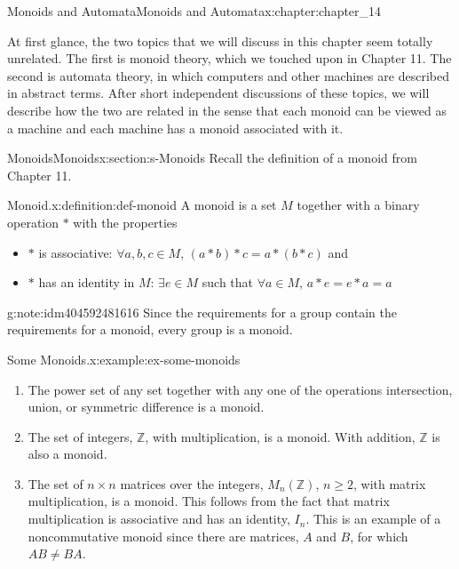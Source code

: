 \documentclass[twoside,10pt,]{book}
\numberwithin{equation}{section}
\begin{document}
\begin{chapterptx}{Monoids and Automata}{}{Monoids and Automata}{}{}{x:chapter:chapter_14}
\begin{introduction}{}%
At first glance, the two topics that we will discuss in this chapter seem totally unrelated. The first is monoid theory, which we touched upon in Chapter 11. The second is automata theory, in which computers and other machines are described in abstract terms. After short independent discussions of these topics, we will describe how the two are related in the sense that each monoid can be viewed as a machine and each machine has a monoid associated with it.%
\end{introduction}%
%
%
\typeout{************************************************}
\typeout{************************************************}
%
\begin{sectionptx}{Monoids}{}{Monoids}{}{}{x:section:s-Monoids}
%
Recall the definition of a monoid from Chapter 11.%
\begin{definition}{Monoid.}{x:definition:def-monoid}%
%
A monoid is a set \(M\) together with a binary operation \(*\) with the properties%
\begin{itemize}[label=\textbullet]
\item{}\(*\) is associative: \(\forall a,b,c \in M\), \((a*b)*c=a*(b*c)\)  and%
\item{}\(*\) has an identity in \(M\):  \(\exists e\in M\) such that \(\forall a \in M\), \(a*e=e*a=a\)%
\end{itemize}
%
\end{definition}
\begin{note}{}{g:note:idm404592481616}%
Since the requirements for a group contain the requirements for a monoid, every group is a monoid.%
\end{note}
\begin{example}{Some Monoids.}{x:example:ex-some-monoids}%
%
\begin{enumerate}[label=(\alph*)]
\item{}The power set of any set together with any one of the operations intersection, union, or symmetric difference is a monoid.%
\item{}The set of integers, \(\mathbb{Z}\), with multiplication, is a monoid. With addition, \(\mathbb{Z}\) is also a monoid.%
\item{}The set of \(n\times n\) matrices over the integers, \(M_n(\mathbb{Z})\), \(n\geq 2\), with matrix multiplication, is a monoid. This follows from the fact that matrix multiplication is associative and has an identity, \(I_n\). This is an example of a noncommutative monoid since there are matrices, \(A\) and \(B\), for which \(A B \neq B A\).%

\end{enumerate}
\end{example}
\end{sectionptx}
\end{chapterptx}
\end{document}
